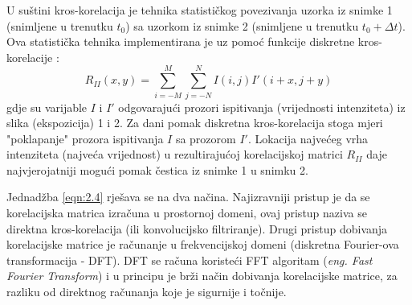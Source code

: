 \par
U suštini kros-korelacija je tehnika statističkog povezivanja uzorka iz snimke 1 (snimljene u trenutku $t_0$) sa uzorkom iz snimke 2 (snimljene u trenutku $t_0 + \Delta{t}$). Ova statistička tehnika implementirana je uz pomoć funkcije diskretne kros-korelacije \cite{raffel2018_book}:
\begin{equation}
	R_{II}(x, y) = \sum_{i=-M}^{M}\sum_{j=-N}^{N}I(i, j)I'(i+x, j+y)
	\label{eqn:2.4}
\end{equation}
gdje su varijable $I$ i $I'$ odgovarajući prozori ispitivanja (vrijednosti intenziteta) iz slika (ekspozicija) 1 i 2. Za dani pomak diskretna kros-korelacija stoga mjeri "poklapanje" prozora ispitivanja $I$ sa prozorom $I'$. Lokacija najvećeg vrha intenziteta (najveća vrijednost) u rezultirajućoj korelacijskoj matrici $R_{II}$ daje najvjerojatniji mogući pomak čestica iz snimke 1 u snimku 2.
\par
Jednadžba \ref{eqn:2.4} rješava se na dva načina. Najizravniji pristup je da se korelacijska matrica izračuna u prostornoj domeni, ovaj pristup naziva se direktna kros-korelacija (ili konvolucijsko filtriranje). Drugi pristup dobivanja korelacijske matrice je računanje u frekvencijskoj domeni (diskretna Fourier-ova transformacija - DFT). DFT se računa koristeći FFT algoritam (\textit{eng. Fast Fourier Transform}) i u principu je brži način dobivanja korelacijske matrice, za razliku od direktnog računanja koje je sigurnije i točnije.
\FloatBarrier
